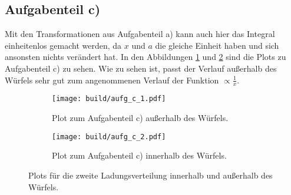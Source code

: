 \subsection*{Aufgabenteil c)}
Mit den Transformationen aus Aufgabenteil a) kann auch hier das Integral einheitenlos
gemacht werden, da $x$ und $a$ die gleiche Einheit haben und sich ansonsten nichts
verändert hat.
In den Abbildungen \ref{subfig:c_1} und \ref{subfig:c_2} sind die Plots zu
Aufgabenteil c) zu sehen. Wie zu sehen ist, passt der Verlauf außerhalb des Würfels
sehr gut zum angenommenen Verlauf der Funktion $\propto \frac{1}{x}$.
\begin{figure}
  \centering
  \begin{subfigure}{0.49\textwidth}
    \centering
    \texttt{[image: build/aufg\_c\_1.pdf]}
    \caption{Plot zum Aufgabenteil c) außerhalb des Würfels.}
    \label{subfig:c_1}
  \end{subfigure}
  \begin{subfigure}{0.49\textwidth}
    \centering
    \texttt{[image: build/aufg\_c\_2.pdf]}
    \caption{Plot zum Aufgabenteil c) innerhalb des Würfels.}
    \label{subfig:c_2}
  \end{subfigure}
  \caption{Plots für die zweite Ladungsverteilung innerhalb und außerhalb
  des Würfels.}
  \label{fig:2}
\end{figure}
